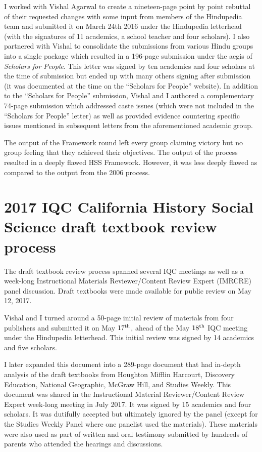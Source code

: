I worked with Vishal Agarwal to create a nineteen-page point by point rebuttal of their requested changes with some input from members of the Hindupedia team and submitted it on March 24th 2016 under the Hindupedia letterhead (with the signatures of 11 academics, a school teacher and four scholars). I also partnered with Vishal to consolidate the submissions from various Hindu groups into a single package which resulted in a 196-page submission under the aegis of \textit{Scholars for People}. This letter was signed by ten academics and four scholars at the time of submission but ended up with many others signing after submission (it was documented at the time on the “Scholars for People” website). In addition to the “Scholars for People” submission, Vishal and I authored a complementary 74-page submission which addressed caste issues (which were not included in the “Scholars for People” letter) as well as provided evidence countering specific issues mentioned in subsequent letters from the aforementioned academic group.

The output of the Framework round left every group claiming victory but no group feeling that they achieved their objectives. The output of the process resulted in a deeply flawed HSS Framework. However, it was less deeply flawed as compared to the output from the 2006 process.

\section*{2017 IQC California History Social Science draft textbook review process}

The draft textbook review process spanned several IQC meetings as well as a week-long Instructional Materials Reviewer/Content Review Expert (IMRCRE) panel discussion. Draft textbooks were made available for public review on May 12, 2017. 

Vishal and I turned around a 50-page initial review of materials from four publishers and submitted it on May $17^{\rm th}$, ahead of the May $18^{\rm th}$ IQC meeting under the Hindupedia letterhead. This initial review was signed by 14 academics and five scholars. 

I later expanded this document into a 289-page document that had in-depth analysis of the draft textbooks from Houghton Mifflin Harcourt, Discovery Education, National Geographic, McGraw Hill, and Studies Weekly. This document was shared in the Instructional Material Reviewer/Content Review Expert week-long meeting in July 2017. It was signed by 15 academics and four scholars. It was dutifully accepted but ultimately ignored by the panel (except for the Studies Weekly Panel where one panelist used the materials). These materials were also used as part of written and oral testimony submitted by hundreds of parents who attended the hearings and discussions.

